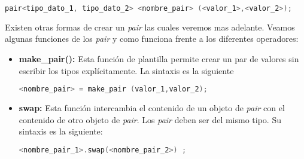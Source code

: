 \begin{lstlisting}[language=C++]
pair<tipo_dato_1, tipo_dato_2> <nombre_pair> (<valor_1>,<valor_2>);
\end{lstlisting}

Existen otras formas de crear un \emph{pair} las cuales veremos mas adelante. Veamos algunas funciones de los \emph{pair} y como funciona frente a los diferentes operadores:

\begin{itemize}
	\item \textbf{make\_pair():} Esta función de plantilla permite crear un par de valores sin escribir los tipos explícitamente. La sintaxis es la siguiente
	\begin{lstlisting}[language=C++]
<nombre_pair> = make_pair (valor_1,valor_2);
	\end{lstlisting}
	
	\item \textbf{swap:} Esta función intercambia el contenido de un objeto de \emph{pair} con el contenido de otro objeto de \emph{pair}. Los \emph{pair} deben ser del mismo tipo. Su sintaxis es la siguiente:
	\begin{lstlisting}[language=C++]
<nombre_pair_1>.swap(<nombre_pair_2>) ;
	\end{lstlisting}
	

\end{itemize}
